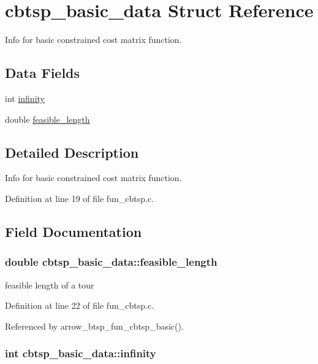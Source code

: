 \hypertarget{structcbtsp__basic__data}{
\section{cbtsp\_\-basic\_\-data Struct Reference}
\label{structcbtsp__basic__data}
}
Info for basic constrained cost matrix function.  


\subsection*{Data Fields}
\begin{CompactItemize}
\item 
int \hyperlink{structcbtsp__basic__data_069c4745b949c50b3645b26ea792af06}{infinity}
\item 
double \hyperlink{structcbtsp__basic__data_149e46676dc1a2310256df3cf097659c}{feasible\_\-length}
\end{CompactItemize}


\subsection{Detailed Description}
Info for basic constrained cost matrix function. 

Definition at line 19 of file fun\_\-cbtsp.c.

\subsection{Field Documentation}
\hypertarget{structcbtsp__basic__data_149e46676dc1a2310256df3cf097659c}{
\subsubsection[{feasible\_\-length}]{\setlength{\rightskip}{0pt plus 5cm}double {\bf cbtsp\_\-basic\_\-data::feasible\_\-length}}}
\label{structcbtsp__basic__data_149e46676dc1a2310256df3cf097659c}


feasible length of a tour 

Definition at line 22 of file fun\_\-cbtsp.c.

Referenced by arrow\_\-btsp\_\-fun\_\-cbtsp\_\-basic().\hypertarget{structcbtsp__basic__data_069c4745b949c50b3645b26ea792af06}{
\subsubsection[{infinity}]{\setlength{\rightskip}{0pt plus 5cm}int {\bf cbtsp\_\-basic\_\-data::infinity}}}
\label{structcbtsp__basic__data_069c4745b949c50b3645b26ea792af06}


